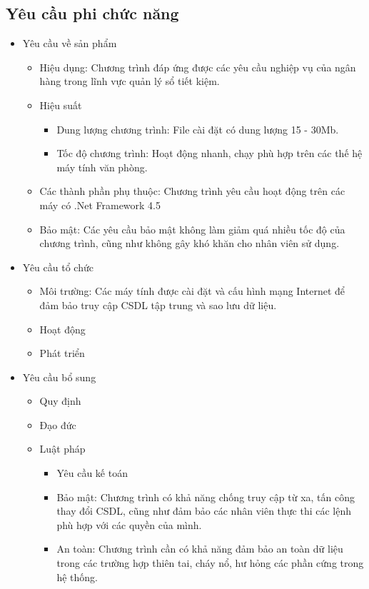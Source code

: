 \documentclass{article}
\begin{document}
		\newpage
	
	\subsection{Yêu cầu phi chức năng}
	
		\begin{itemize}
			\item Yêu cầu về sản phẩm
			
				\begin{itemize}
					\item Hiệu dụng: Chương trình đáp ứng được các yêu cầu nghiệp vụ của ngân hàng trong lĩnh vực quản lý sổ tiết kiệm.
					\item Hiệu suất
					
						\begin{itemize}
							\item Dung lượng chương trình: File cài đặt có dung lượng 15 - 30Mb.
							\item Tốc độ chương trình: Hoạt động nhanh, chạy phù hợp trên các thế hệ máy tính văn phòng.
						\end{itemize}
					
					\item Các thành phần phụ thuộc: Chương trình yêu cầu hoạt động trên các máy có .Net Framework 4.5
					\item Bảo mật: Các yêu cầu bảo mật không làm giảm quá nhiều tốc độ của chương trình, cũng như không gây khó khăn cho nhân viên sử dụng.
				\end{itemize}
			
			\item Yêu cầu tổ chức
			
				\begin{itemize}
					\item Môi trường: Các máy tính được cài đặt và cấu hình mạng Internet để đảm bảo truy cập CSDL tập trung và sao lưu dữ liệu.
					\item Hoạt động
					\item Phát triển
				\end{itemize}
			
			\item Yêu cầu bổ sung
			
				\begin{itemize}
					\item Quy định
					\item Đạo đức
					\item Luật pháp
					
						\begin{itemize}
							\item Yêu cầu kế toán
							\item Bảo mật: Chương trình có khả năng chống truy cập từ xa, tấn công thay đổi CSDL, cũng như đảm bảo các nhân viên thực thi các lệnh phù hợp với các quyền của mình.
							\item An toàn: Chương trình cần có khả năng đảm bảo an toàn dữ liệu trong các trường hợp thiên tai, cháy nổ, hư hỏng các phần cứng trong hệ thống.
						\end{itemize}
					

\end{itemize}
\end{itemize}
\end{document}

